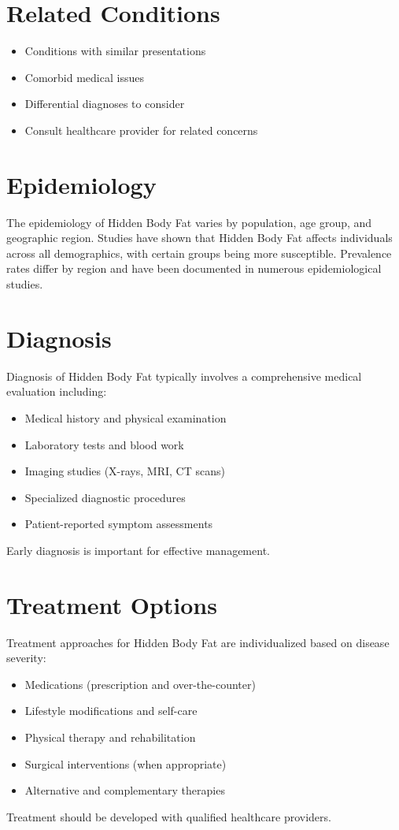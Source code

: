 \section*{Related Conditions}
\begin{itemize}
  \item Conditions with similar presentations
  \item Comorbid medical issues
  \item Differential diagnoses to consider
  \item Consult healthcare provider for related concerns
\end{itemize}

\section*{Epidemiology}
The epidemiology of Hidden Body Fat varies by population, age group, and geographic region. Studies have shown that Hidden Body Fat affects individuals across all demographics, with certain groups being more susceptible. Prevalence rates differ by region and have been documented in numerous epidemiological studies.

\section*{Diagnosis}
Diagnosis of Hidden Body Fat typically involves a comprehensive medical evaluation including:
\begin{itemize}
  \item Medical history and physical examination
  \item Laboratory tests and blood work
  \item Imaging studies (X-rays, MRI, CT scans)
  \item Specialized diagnostic procedures
  \item Patient-reported symptom assessments
\end{itemize}
Early diagnosis is important for effective management.

\section*{Treatment Options}
Treatment approaches for Hidden Body Fat are individualized based on disease severity:
\begin{itemize}
  \item Medications (prescription and over-the-counter)
  \item Lifestyle modifications and self-care
  \item Physical therapy and rehabilitation
  \item Surgical interventions (when appropriate)
  \item Alternative and complementary therapies
\end{itemize}
Treatment should be developed with qualified healthcare providers.

